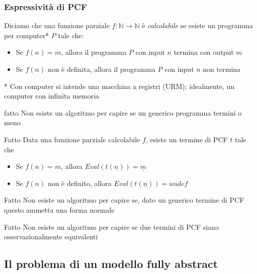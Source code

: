 \documentclass{beamer}
\begin{document}
\begin{frame}
	
	\frametitle{Espressività di PCF}
	
	Diciamo che una funzione parziale $f:\mathbb{N}\rightarrow \mathbb{N}$ è \emph{calcolabile} se esiste un programma per computer* $P$ tale che:
	\begin{itemize}
		\item Se $f(n)=m$, allora il programma $P$ con input $n$ termina con output $m$
		\item Se $f(n)$ non è definita, allora il programma $P$ con input $n$ non termina
	\end{itemize}
	
	* Con computer si intende una macchina a registri (URM); idealmente, un computer con infinita memoria
	
	\begin{block}{fatto}
		Non esiste un algoritmo per capire se un generico programma termini o meno
	\end{block}

	
\end{frame}


\begin{frame}
	
	\begin{block}{Fatto}
		Data una funzione parziale calcolabile $f$, esiste un termine di PCF $t$ tale che
		\begin{itemize}
			\item Se $f(n)=m$, allora $Eval(t(\underline{n}))=\underline{m}$
			\item Se $f(n)$ non è definito, allora $Eval(t(\underline{n}))=undef$
		\end{itemize}

	\end{block}
	
	\begin{block}{Fatto}
		Non esiste un algoritmo per capire se, dato un generico termine di PCF questo ammetta una forma normale
	\end{block}
	
	\begin{block}{Fatto}
		Non esiste un algoritmo per capire se due termini di PCF siano osservazionalmente equivalenti
	\end{block}

	
\end{frame}



\subsection{Il problema di un modello fully abstract}
\end{document}
